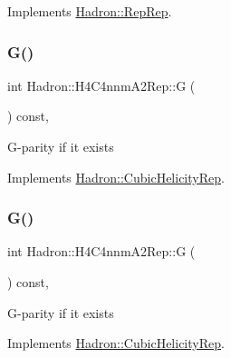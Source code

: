 Implements \mbox{\hyperlink{structHadron_1_1RepRep_a92c8802e5ed7afd7da43ccfd5b7cd92b}{Hadron\+::\+Rep\+Rep}}.

\mbox{\label{structHadron_1_1H4C4nnmA2Rep_a5c05be95f9244ace91a9e81832e816e8}} 
\subsubsection{\texorpdfstring{G()}{G()}\hspace{0.1cm}{\footnotesize\ttfamily [1/3]}}
{\footnotesize\ttfamily int Hadron\+::\+H4\+C4nnm\+A2\+Rep\+::G (\begin{DoxyParamCaption}{ }\end{DoxyParamCaption}) const\hspace{0.3cm}{\ttfamily [inline]}, {\ttfamily [virtual]}}

G-\/parity if it exists 

Implements \mbox{\hyperlink{structHadron_1_1CubicHelicityRep_a50689f42be1e6170aa8cf6ad0597018b}{Hadron\+::\+Cubic\+Helicity\+Rep}}.

\mbox{\label{structHadron_1_1H4C4nnmA2Rep_a5c05be95f9244ace91a9e81832e816e8}} 
\subsubsection{\texorpdfstring{G()}{G()}\hspace{0.1cm}{\footnotesize\ttfamily [2/3]}}
{\footnotesize\ttfamily int Hadron\+::\+H4\+C4nnm\+A2\+Rep\+::G (\begin{DoxyParamCaption}{ }\end{DoxyParamCaption}) const\hspace{0.3cm}{\ttfamily [inline]}, {\ttfamily [virtual]}}

G-\/parity if it exists 

Implements \mbox{\hyperlink{structHadron_1_1CubicHelicityRep_a50689f42be1e6170aa8cf6ad0597018b}{Hadron\+::\+Cubic\+Helicity\+Rep}}.

\mbox{\label{structHadron_1_1H4C4nnmA2Rep_a5c05be95f9244ace91a9e81832e816e8}} 
